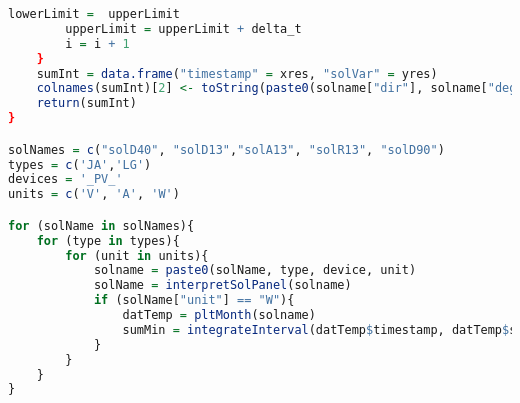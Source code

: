 \begin{lstlisting}[language=R]
        lowerLimit =  upperLimit
        upperLimit = upperLimit + delta_t
        i = i + 1      
    }
    sumInt = data.frame("timestamp" = xres, "solVar" = yres)
    colnames(sumInt)[2] <- toString(paste0(solname["dir"], solname["degree"], solname["type"]))
    return(sumInt)
}

solNames = c("solD40", "solD13","solA13", "solR13", "solD90")
types = c('JA','LG')
devices = '_PV_'
units = c('V', 'A', 'W')

for (solName in solNames){
    for (type in types){
        for (unit in units){
            solname = paste0(solName, type, device, unit)
            solName = interpretSolPanel(solname)
            if (solName["unit"] == "W"){
                datTemp = pltMonth(solname)
                sumMin = integrateInterval(datTemp$timestamp, datTemp$solVar, dminutes(5), "min", solname)
            }
        }
    }
}

\end{lstlisting}
